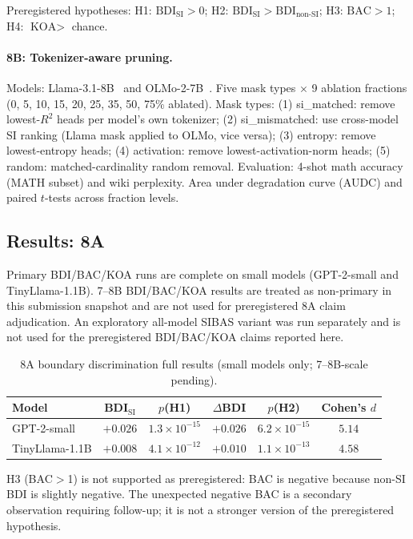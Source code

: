 \documentclass{article}
\begin{document}
Preregistered hypotheses: H1: $\text{BDI}_\text{SI} > 0$; H2: $\text{BDI}_\text{SI} >
\text{BDI}_\text{non-SI}$; H3: $\text{BAC} > 1$; H4: $\text{KOA} > $ chance.

\paragraph{8B: Tokenizer-aware pruning.} Models: Llama-3.1-8B~\citep{dubey2024llama3} and
OLMo-2-7B~\citep{groeneveld2024olmo}. Five mask types $\times$ 9 ablation fractions
(0, 5, 10, 15, 20, 25, 35, 50, 75\% ablated). Mask types: (1) si\_matched: remove
lowest-$R^2$ heads per model's own tokenizer; (2) si\_mismatched: use cross-model SI
ranking (Llama mask applied to OLMo, vice versa); (3) entropy: remove lowest-entropy heads;
(4) activation: remove lowest-activation-norm heads; (5) random: matched-cardinality random
removal. Evaluation: 4-shot math accuracy (MATH subset) and wiki perplexity. Area under
degradation curve (AUDC) and paired $t$-tests across fraction levels.

\subsection{Results: 8A}

Primary BDI/BAC/KOA runs are complete on small models (GPT-2-small and TinyLlama-1.1B).
7--8B BDI/BAC/KOA results are treated as non-primary in this submission snapshot and
are not used for preregistered 8A claim adjudication.
An exploratory all-model SIBAS variant was run separately and is not used for the
preregistered BDI/BAC/KOA claims reported here.

\begin{table}[htbp]
    \caption{8A boundary discrimination full results (small models only; 7--8B-scale pending).}
    \centering
    \small
    \begin{tabular}{lccccc}
        \toprule
        Model & BDI$_\text{SI}$ & $p$(H1) & $\Delta$BDI & $p$(H2) & Cohen's $d$ \\
        \midrule
        GPT-2-small & $+0.026$ & $1.3\times10^{-15}$ & $+0.026$ & $6.2\times10^{-15}$ & $5.14$ \\
        TinyLlama-1.1B & $+0.008$ & $4.1\times10^{-12}$ & $+0.010$ & $1.1\times10^{-13}$ & $4.58$ \\
        \bottomrule
    \end{tabular}
\end{table}

H3 (BAC$>$1) is not supported as preregistered: BAC is negative because non-SI BDI is
slightly negative. The unexpected negative BAC is a secondary observation requiring
follow-up; it is not a stronger version of the preregistered hypothesis.
\end{document}

